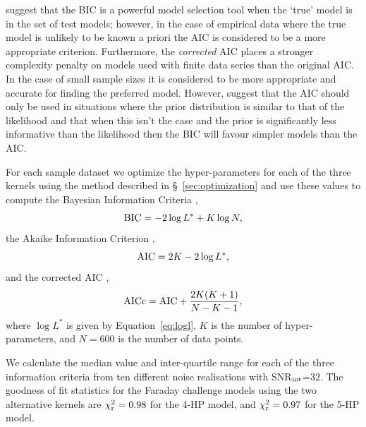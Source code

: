 \documentclass[fleqn,usenatbib]{mnras}
\begin{document}
\cite{burnham} suggest that the  BIC is  a powerful model selection tool when the `true' model is in the set of test models; however, in the case of empirical data where the true model is unlikely to be known a priori the AIC is considered to be a more appropriate criterion. Furthermore, the \emph{corrected} AIC places a stronger complexity penalty on models used with finite data series than the original AIC. In the case of small sample sizes it is considered to be more appropriate and accurate for finding the preferred model. However, \cite{kassrafferty} suggest that the AIC should only be used in situations where the prior distribution is similar to that of the likelihood and that when this isn't the case and the prior is significantly less informative than the likelihood then the BIC will favour simpler models than the AIC.

For each sample dataset we optimize the hyper-parameters for each of the three kernels using the method described in \S~\ref{sec:optimization} and use these values to compute the Bayesian Information Criteria \citep[BIC;][]{1978AnSta...6..461S},
%
\begin{equation}
{\rm BIC} = -2 \log L^\ast + K \log N,
\end{equation}
%
the Akaike Information Criterion \citep[AIC;][]{AIC},
%
\begin{equation}
{\rm AIC} = 2 K - 2\log L^\ast,
\end{equation}
%
and the corrected AIC \citep[AICc;][]{AICc},
%
\begin{equation}
{\rm AICc} = {\rm AIC} + \frac{2K(K+1)}{N - K - 1},
\end{equation}
%
where $\log L^\ast$ is given by Equation~\ref{eq:logl}, $K$ is the number of hyper-parameters, and $N=600$ is the number of data points.

We calculate the median value and inter-quartile range for each of the three information criteria from ten different noise realisations with SNR$_{\rm int}$=32.
%
The goodness of fit statistics for the Faraday challenge models using the two alternative kernels are $\chi^2_{\rm r} = 0.98$ for the 4-HP model, and $\chi^2_{\rm r} = 0.97$ for the 5-HP model.
\end{document}
